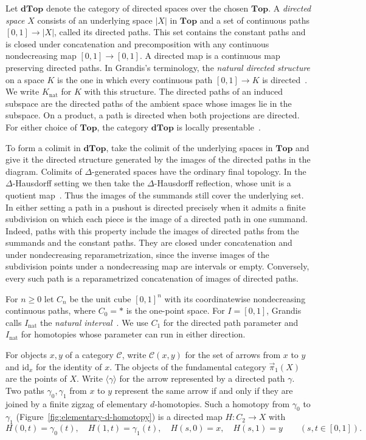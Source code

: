 \documentclass[12pt,a4paper]{amsart}
\theoremstyle{definition}
\renewcommand{\geq}{\geqslant}
\renewcommand{\vec}{\overrightarrow}
\newcommand{\D}{\mathbf{dTop}}
\newcommand{\rev}[1]{#1_{\mathrm{nat}}}
\newcommand{\Iv}{\rev{I}}
\newcommand{\cube}[1]{C_{#1}}
\newcommand{\abs}[1]{\lvert#1\rvert}
\newcommand{\PiC}{\vec{\pi}_1}
\newcommand{\clp}[1]{\langle #1\rangle}
\begin{document}
Let $\D$ denote the category of directed spaces over the chosen $\mathbf{Top}$. A \textit{directed space} $X$ consists of an underlying space $\abs X$ in $\mathbf{Top}$ and a set of continuous paths $[0,1]\to\abs X$, called its directed paths. This set contains the constant paths and is closed under concatenation and precomposition with any continuous nondecreasing map $[0,1]\to[0,1]$. A directed map is a continuous map preserving directed paths. In Grandis's terminology, the \emph{natural directed structure} on a space $K$ is the one in which every continuous path $[0,1]\to K$ is directed~\cite[Section~1.1, pp.~284--285]{mg}. We write $\rev K$ for $K$ with this structure. The directed paths of an induced subspace are the directed paths of the ambient space whose images lie in the subspace. On a product, a path is directed when both projections are directed. For either choice of $\mathbf{Top}$, the category $\D$ is locally presentable~\cite[p.~21, after Definition~3.5]{GlobularNaturalSystem}.

To form a colimit in $\D$, take the colimit of the underlying spaces in $\mathbf{Top}$ and give it the directed structure generated by the images of the directed paths in the diagram. Colimits of $\Delta$-generated spaces have the ordinary final topology. In the $\Delta$-Hausdorff setting we then take the $\Delta$-Hausdorff reflection, whose unit is a quotient map~\cite[Proposition~B.7 and its proof]{leftproperflow}. Thus the images of the summands still cover the underlying set. In either setting a path in a pushout is directed precisely when it admits a finite subdivision on which each piece is the image of a directed path in one summand. Indeed, paths with this property include the images of directed paths from the summands and the constant paths. They are closed under concatenation and under nondecreasing reparametrization, since the inverse images of the subdivision points under a nondecreasing map are intervals or empty. Conversely, every such path is a reparametrized concatenation of images of directed paths.

For $n\geq0$ let $\cube n$ be the unit cube $[0,1]^n$ with its coordinatewise nondecreasing continuous paths, where $\cube 0=*$ is the one-point space. For $I=[0,1]$, Grandis calls $\Iv$ the \emph{natural interval}~\cite[Section~1.2]{mg}. We use $\cube 1$ for the directed path parameter and $\Iv$ for homotopies whose parameter can run in either direction.

For objects $x,y$ of a category $\mathcal C$, write $\mathcal C(x,y)$ for the set of arrows from $x$ to $y$ and $\mathrm{id}_x$ for the identity of $x$. The objects of the fundamental category $\PiC(X)$ are the points of $X$. Write $\clp{\gamma}$ for the arrow represented by a directed path $\gamma$. Two paths $\gamma_0,\gamma_1$ from $x$ to $y$ represent the same arrow if and only if they are joined by a finite zigzag of elementary $d$-homotopies. Such a homotopy from $\gamma_0$ to $\gamma_1$ (Figure~\ref{fig:elementary-d-homotopy}) is a directed map $H\colon\cube 2\to X$ with
\[
 H(0,t)=\gamma_0(t),\quad H(1,t)=\gamma_1(t),\quad H(s,0)=x,\quad H(s,1)=y \qquad (s,t\in[0,1]).
\]
\end{document}
